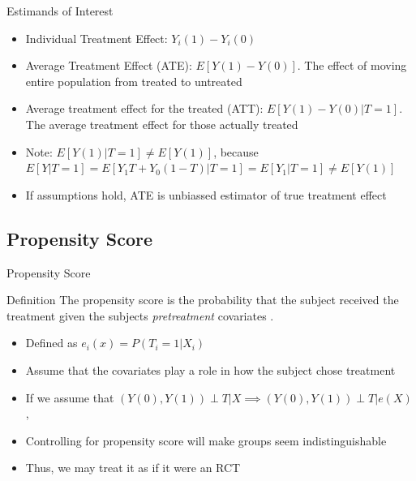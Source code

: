 \begin{frame}{Estimands of Interest}
 \begin{itemize}
 \item Individual Treatment Effect: $Y_i(1)-Y_i(0)$
 \item Average Treatment Effect (ATE): $E[Y(1)-Y(0)]$. The effect of moving entire population
 from treated to untreated
 \item Average treatment effect for the treated (ATT): $E[Y(1)-Y(0)|T=1]$. The average treatment
 effect for those actually treated
 \item Note:  $E[Y(1)|T=1]\neq E[Y(1)]$, because $E[Y|T=1]=E[Y_1T+Y_0(1-T)|T=1]=E[Y_1|T=1]\neq E[Y(1)]$
\item If assumptions hold, ATE is unbiassed estimator of true treatment effect
 \end{itemize}
 
\end{frame}

\subsection{Propensity Score}
\begin{frame}{Propensity Score}
\begin{block}{Definition}
The propensity score is the probability that the subject received the treatment given the subjects \textit{pretreatment}
covariates \cite{Rosenbaum1983}.
\end{block}
 \begin{itemize}
  \item Defined as  $e_i(x)=P(T_i =1 |X_i)$
  \item Assume that the covariates play a role in how the subject chose treatment
  \item If we assume that $(Y(0),Y(1))\perp T|X \implies (Y(0),Y(1))\perp T|e(X)$, \cite{Rosenbaum1983}
  \item Controlling for propensity score will make groups seem indistinguishable
  \item Thus, we may treat it as if it were an RCT
 \end{itemize}

\end{frame}

